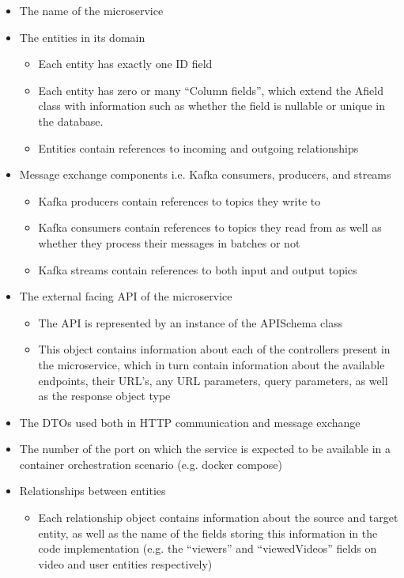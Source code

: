 \documentclass[parskip=full]{article}
\begin{document}
    \begin{itemize}
        \item	The name of the microservice
        \item	The entities in its domain
        \begin{itemize}
            \item Each entity has exactly one ID field
            \item Each entity has zero or many ``Column fields'', which extend the Afield class with information such as whether the field is nullable or unique in the database.
            \item Entities contain references to incoming and outgoing relationships
        \end{itemize}
        \item	Message exchange components i.e. Kafka consumers, producers, and streams
        \begin{itemize}
            \item Kafka producers contain references to topics they write to
            \item Kafka consumers contain references to topics they read from as well as whether they process their messages in batches or not
            \item Kafka streams contain references to both input and output topics
        \end{itemize}
        \item	The external facing API of the microservice
        \begin{itemize}
        \item The API is represented by an instance of the APISchema class
        \item This object contains information about each of the controllers present in the microservice, which in turn contain information about the available endpoints, their URL's, any URL parameters, query parameters, as well as the response object type
        \end{itemize}
        \item	The DTOs used both in HTTP communication and message exchange
        \item	The number of the port on which the service is expected to be available in a container orchestration scenario (e.g. docker compose)
        \item	Relationships between entities
        \begin{itemize}
        \item Each relationship object contains information about the source and target entity, as well as the name of the fields storing this information in the code implementation (e.g. the ``viewers'' and ``viewedVideos'' fields on video and user entities respectively)

\end{itemize}
\end{itemize}
\end{document}
